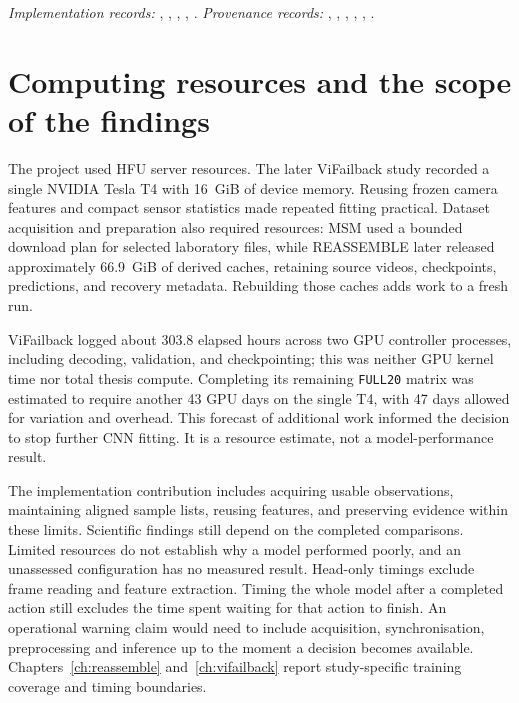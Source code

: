 \noindent\textit{Implementation records:} , ,
, , . \textit{Provenance records:} ,
, , , ,
.

\section{Computing resources and the scope of the findings}
\label{sec:ch4-boundaries}

The project used HFU server resources. The later ViFailback study recorded a single
NVIDIA Tesla T4 with 16~GiB of device memory. Reusing frozen camera features and compact
sensor statistics made repeated fitting practical. Dataset acquisition and preparation
also required resources: MSM used a bounded download plan for selected laboratory files,
while REASSEMBLE later released approximately 66.9~GiB of derived caches, retaining
source videos, checkpoints, predictions, and recovery metadata. Rebuilding those caches
adds work to a fresh run.

ViFailback logged about 303.8 elapsed hours across two GPU controller processes,
including decoding, validation, and checkpointing; this was neither GPU kernel time nor
total thesis compute. Completing its remaining \texttt{FULL20} matrix was estimated to
require another 43 GPU days on the single T4, with 47 days allowed for variation and
overhead. This forecast of additional work informed the decision to stop further CNN
fitting. It is a resource estimate, not a model-performance result.

The implementation contribution includes acquiring usable observations, maintaining
aligned sample lists, reusing features, and preserving evidence within these limits.
Scientific findings still depend on the completed comparisons. Limited resources do not
establish why a model performed poorly, and an unassessed configuration has no measured
result. Head-only timings exclude frame reading and feature extraction. Timing the
whole model after a completed action still excludes the time spent waiting for that
action to finish. An operational warning claim would need to include acquisition,
synchronisation, preprocessing and inference up to the moment a decision becomes
available. Chapters~\ref{ch:reassemble} and~\ref{ch:vifailback} report study-specific
training coverage and timing boundaries.

